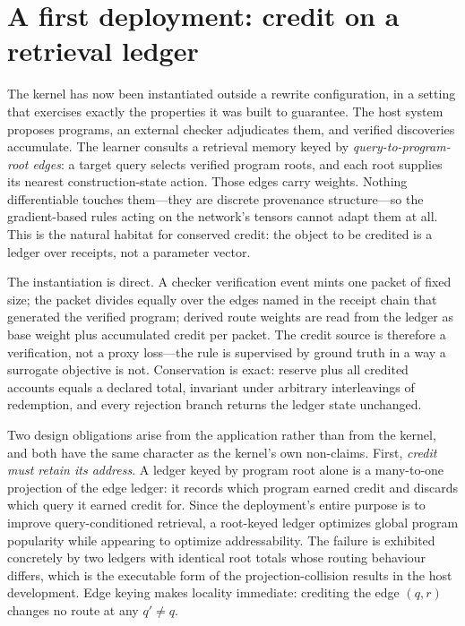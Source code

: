 \documentclass[11pt]{article}
\begin{document}
\section{A first deployment: credit on a retrieval ledger}
\label{sec:deployment-routing}

The kernel has now been instantiated outside a rewrite configuration, in a setting that
exercises exactly the properties it was built to guarantee.  The host system proposes
programs, an external checker adjudicates them, and verified discoveries accumulate.  The
learner consults a retrieval memory keyed by \emph{query-to-program-root edges}: a target
query selects verified program roots, and each root supplies its nearest construction-state
action.  Those edges carry weights.  Nothing differentiable touches them---they are
discrete provenance structure---so the gradient-based rules acting on the network's tensors
cannot adapt them at all.  This is the natural habitat for conserved credit: the object to
be credited is a ledger over receipts, not a parameter vector.

The instantiation is direct.  A checker verification event mints one packet of fixed size;
the packet divides equally over the edges named in the receipt chain that generated the
verified program; derived route weights are read from the ledger as base weight plus
accumulated credit per packet.  The credit source is therefore a verification, not a proxy
loss---the rule is supervised by ground truth in a way a surrogate objective is not.
Conservation is exact: reserve plus all credited accounts equals a declared total,
invariant under arbitrary interleavings of redemption, and every rejection branch returns
the ledger state unchanged.

Two design obligations arise from the application rather than from the kernel, and both
have the same character as the kernel's own non-claims.  First, \emph{credit must retain
its address}.  A ledger keyed by program root alone is a many-to-one projection of the
edge ledger: it records which program earned credit and discards which query it earned
credit for.  Since the deployment's entire purpose is to improve query-conditioned
retrieval, a root-keyed ledger optimizes global program popularity while appearing to
optimize addressability.  The failure is exhibited concretely by two ledgers with
identical root totals whose routing behaviour differs, which is the executable form of the
projection-collision results in the host development.  Edge keying makes locality
immediate: crediting the edge $(q,r)$ changes no route at any $q'\neq q$.
\end{document}
